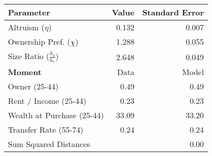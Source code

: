 \begin{tabular}{lrr}
\toprule   
 \textbf{Parameter} & Value & Standard Error\\
\midrule
Altruism ($\eta$) & 0.132 & 0.007\\
Ownership Pref. ($\chi$) & 1.288 & 0.055\\
Size Ratio ($\frac{h_o}{h_r}$) & 2.648 & 0.049\\
\cmidrule(lr){1-3} 

 
\textbf{Moment} & Data & Model\\
\midrule
Owner (25-44) & 0.49 & 0.49\\
Rent / Income (25-44) & 0.23 & 0.23\\
Wealth at Purchase (25-44) & 33.09 & 33.20\\
Transfer Rate (55-74) & 0.24 & 0.24\\
\midrule 
 Sum Squared Distances &  & 0.00\\
\bottomrule
\end{tabular}
